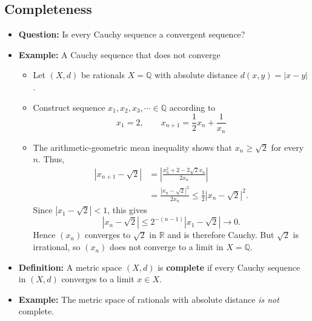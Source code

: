 \documentclass[11pt,twoside]{report}
\newcommand{\bbQ}{{\mathbb{Q}}}
\begin{document}
\subsection{Completeness} 

\begin{itemize}

\item \textbf{Question:} Is every Cauchy sequence a convergent sequence?


\item \textbf{Example:}  A Cauchy sequence that does not converge 
\begin{itemize}
\item Let $(X, d)$ be rationals $X = \bbQ$ with absolute distance $d(x,y) = |x- y|$. 
\item Construct sequence $x_1, x_2, x_3, \cdots \in \bbQ$ according to 
\[
x_1 = 2, \qquad x_{n+1} = \frac{1}{2} x_n + \frac{1}{x_n} 
\]
\item The arithmetic-geometric mean inequality shows that $x_n \geq \sqrt{2}$ for every $n$.  Thus,
\begin{align*}
\left|x_{n+1}-\sqrt{2}\right|
&= \left|\frac{x_n^2+2-2\sqrt{2}x_n}{2x_n}\right| \\
&= \frac{\left|x_n-\sqrt{2}\right|^2}{2x_n}
 \leq \frac{1}{2}\left|x_n-\sqrt{2}\right|^2.
\end{align*}
Since $|x_1-\sqrt{2}|<1$, this gives
\[
\left|x_n-\sqrt{2}\right| \leq 2^{-(n-1)}\left|x_1-\sqrt{2}\right| \longrightarrow 0.
\]
Hence $(x_n)$ converges to $\sqrt{2}$ in $\mathbb{R}$ and is therefore Cauchy.  But $\sqrt{2}$ is irrational, so $(x_n)$ does not converge to a limit in $X=\mathbb{Q}$.
\end{itemize}




\item \textbf{Definition:} A metric space $(X,d)$ is  \textbf{complete} if every Cauchy sequence in $(X,d)$ converges to a limit $x \in X$.

\item \textbf{Example:}  The metric space of rationals with absolute distance \emph{is not} complete. 

%


\end{itemize}
\end{document}
